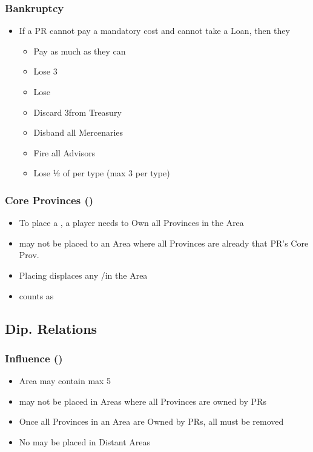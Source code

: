 \documentclass[10pt]{article}
\begin{document}
\subsubsection*{Bankruptcy }
\begin{itemize}
	\item If a PR cannot pay a mandatory \ducat cost and cannot take a Loan, then they
	\begin{itemize}
		\item Pay as much \ducats as they can
		\item Lose 3\stability
		\item Lose 
		\item Discard 3\interest from Treasury
		\item Disband all Mercenaries
		\item Fire all Advisors
		\item Lose ½ of \monarchpower per type (max 3 per type)
	\end{itemize}
\end{itemize}

\subsubsection*{Core Provinces (\core) }
\begin{itemize}
	\item To place a \core, a player needs to Own all Provinces in the Area
	\item \core may not be placed to an Area where all Provinces are already that PR's Core Prov.
	\item Placing \core displaces any \core/\dnpr in the Area
	\item \core counts as \claim
\end{itemize}

\subsection*{Dip. Relations }
\subsubsection*{Influence (\influence) }
\begin{itemize}
	\item Area may contain max 5 \influence
	\item \influence may not be placed in Areas where all Provinces are owned by PRs
	\item Once all Provinces in an Area are Owned by PRs, all \influence must be removed
	\item No \influence may be placed in Distant Areas
\end{itemize}
\end{document}
